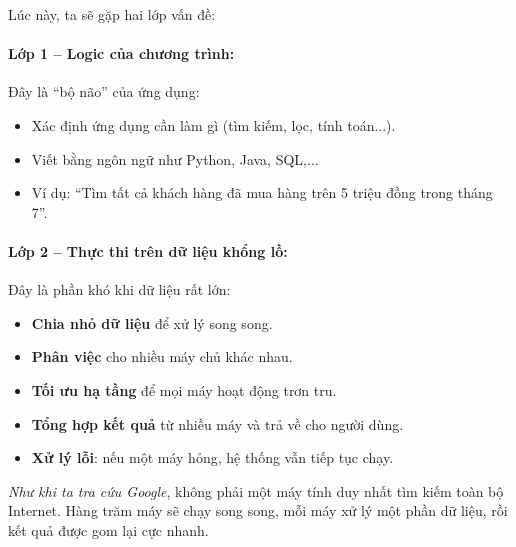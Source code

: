 \documentclass[11pt]{article}
\begin{document}
Lúc này, ta sẽ gặp hai lớp vấn đề:

\paragraph{Lớp 1 -- Logic của chương trình:}
Đây là ``bộ não'' của ứng dụng:
\begin{itemize}
    \item Xác định ứng dụng cần làm gì (tìm kiếm, lọc, tính toán...).
    \item Viết bằng ngôn ngữ như Python, Java, SQL,...
    \item Ví dụ: ``Tìm tất cả khách hàng đã mua hàng trên 5 triệu đồng trong tháng 7''.
\end{itemize}

\paragraph{Lớp 2 -- Thực thi trên dữ liệu khổng lồ:}
Đây là phần khó khi dữ liệu rất lớn:
\begin{itemize}
    \item \textbf{Chia nhỏ dữ liệu} để xử lý song song.
    \item \textbf{Phân việc} cho nhiều máy chủ khác nhau.
    \item \textbf{Tối ưu hạ tầng} để mọi máy hoạt động trơn tru.
    \item \textbf{Tổng hợp kết quả} từ nhiều máy và trả về cho người dùng.
    \item \textbf{Xử lý lỗi}: nếu một máy hỏng, hệ thống vẫn tiếp tục chạy.
\end{itemize}

\noindent\textit{Như khi ta tra cứu  Google}, không phải một máy tính duy nhất tìm kiếm toàn bộ Internet. Hàng trăm máy sẽ chạy song song, mỗi máy xử lý một phần dữ liệu, rồi kết quả được gom lại cực nhanh.



\end{document}
